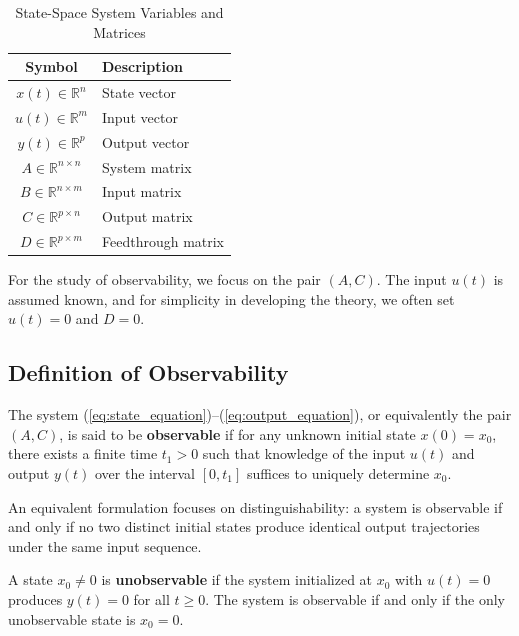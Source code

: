 \begin{table}[ht]
\centering
\caption{State-Space System Variables and Matrices}
\label{tab:state_space_variables}
\begin{tabular}{@{}cl@{}}
\toprule
\textbf{Symbol} & \textbf{Description} \\
\midrule
$x(t) \in \mathbb{R}^n$ & State vector \\
$u(t) \in \mathbb{R}^m$ & Input vector \\
$y(t) \in \mathbb{R}^p$ & Output vector \\
$A \in \mathbb{R}^{n \times n}$ & System matrix \\
$B \in \mathbb{R}^{n \times m}$ & Input matrix \\
$C \in \mathbb{R}^{p \times n}$ & Output matrix \\
$D \in \mathbb{R}^{p \times m}$ & Feedthrough matrix \\
\bottomrule
\end{tabular}
\end{table}

For the study of observability, we focus on the pair $(A, C)$. The input $u(t)$ is assumed known, and for simplicity in developing the theory, we often set $u(t) = 0$ and $D = 0$.

\subsection{Definition of Observability}

\begin{definition}[Observability]
The system (\ref{eq:state_equation})--(\ref{eq:output_equation}), or equivalently the pair $(A, C)$, is said to be \textbf{observable} if for any unknown initial state $x(0) = x_0$, there exists a finite time $t_1 > 0$ such that knowledge of the input $u(t)$ and output $y(t)$ over the interval $[0, t_1]$ suffices to uniquely determine $x_0$.
\end{definition}

An equivalent formulation focuses on distinguishability: a system is observable if and only if no two distinct initial states produce identical output trajectories under the same input sequence.

\begin{definition}
A state $x_0 \neq 0$ is \textbf{unobservable} if the system initialized at $x_0$ with $u(t) = 0$ produces $y(t) = 0$ for all $t \geq 0$. The system is observable if and only if the only unobservable state is $x_0 = 0$.
\end{definition}

